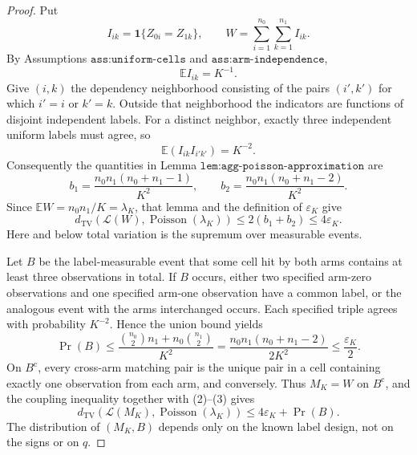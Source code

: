\documentclass{article}
\begin{document}
\begin{proof}
Put
\[
 I_{ik}=\mathbf 1\{Z_{0i}=Z_{1k}\},
 \qquad
 W=\sum_{i=1}^{n_0}\sum_{k=1}^{n_1}I_{ik}.
\]
By Assumptions \(\texttt{ass:uniform-cells}\) and
\(\texttt{ass:arm-independence}\),
\[
 \mathbb E I_{ik}=K^{-1}.
 \tag{1}
\]
Give \((i,k)\) the dependency neighborhood consisting of the pairs
\((i',k')\) for which \(i'=i\) or \(k'=k\).  Outside that neighborhood
the indicators are functions of disjoint independent labels.  For a
distinct neighbor, exactly three independent uniform labels must agree,
so
\[
 \mathbb E(I_{ik}I_{i'k'})=K^{-2}.
\]
Consequently the quantities in
Lemma \(\texttt{lem:agg-poisson-approximation}\) are
\[
 b_1=\frac{n_0n_1(n_0+n_1-1)}{K^2},
 \qquad
 b_2=\frac{n_0n_1(n_0+n_1-2)}{K^2}.
\]
Since \(\mathbb EW=n_0n_1/K=\lambda_K\), that lemma and the definition of
\(\varepsilon_K\) give
\[
 d_{\mathrm{TV}}\!\left(\mathcal L(W),
       \operatorname{Poisson}(\lambda_K)\right)
 \le 2(b_1+b_2)
 \le 4\varepsilon_K.
 \tag{2}
\]
Here and below total variation is the supremum over measurable events.

Let \(B\) be the label-measurable event that some cell hit by both arms
contains at least three observations in total.  If \(B\) occurs, either
two specified arm-zero observations and one specified arm-one
observation have a common label, or the analogous event with the arms
interchanged occurs.  Each specified triple agrees with probability
\(K^{-2}\).  Hence the union bound yields
\[
 \Pr(B)
 \le
 \frac{\binom{n_0}{2}n_1+n_0\binom{n_1}{2}}{K^2}
 =
 \frac{n_0n_1(n_0+n_1-2)}{2K^2}
 \le \frac{\varepsilon_K}{2}.
 \tag{3}
\]
On \(B^{\mathrm c}\), every cross-arm matching pair is the unique pair in
a cell containing exactly one observation from each arm, and conversely.
Thus \(M_K=W\) on \(B^{\mathrm c}\), and the coupling inequality together
with (2)--(3) gives
\[
 d_{\mathrm{TV}}\!\left(\mathcal L(M_K),
       \operatorname{Poisson}(\lambda_K)\right)
 \le 4\varepsilon_K+\Pr(B).
 \tag{4}
\]
The distribution of \((M_K,B)\) depends only on the known label design,
not on the signs or on \(q\).


\end{proof}
\end{document}
